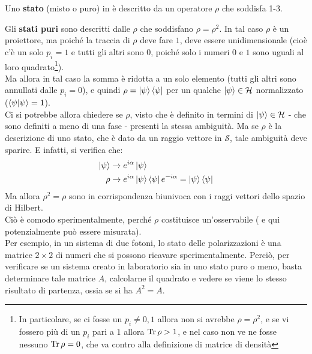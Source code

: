 \documentclass[../../FisicaTeorica.tex]{subfiles}
\begin{document}
\begin{dfn}
Uno \textbf{stato} (misto o puro) in \MQ è descritto da un operatore $\rho$ che soddisfa 1-3.
\end{dfn}
Gli \textbf{stati puri} sono descritti dalle $\rho$ che soddisfano $\rho =\rho^2$. In tal caso $\rho$  è un proiettore, ma poiché la traccia di $\rho$ deve fare $1$, deve essere unidimensionale (cioè c'è un solo $p_i=1$ e tutti gli altri sono $0$, poiché solo i numeri $0$ e $1$ sono uguali al loro quadrato\footnote{In particolare, se ci fosse un $p_i \neq 0,1$ allora non si avrebbe $\rho = \rho^2$, e se vi fossero più di un $p_i$ pari a $1$ allora $\operatorname{Tr}\rho > 1$, e nel caso non ve ne fosse nessuno $\operatorname{Tr}\rho = 0$, che va contro alla definizione di matrice di densità}).\\
Ma allora in tal caso la somma è ridotta a un solo elemento (tutti gli altri sono annullati dalle $p_i = 0$), e quindi $\rho =\ket{\psi}\bra{\psi}$ per un qualche $\ket{\psi}\in \mathcal{H}$ normalizzato  ($\braket{\psi|\psi}=1$).\\
Ci si potrebbe allora chiedere se $\rho$, visto che è definito in termini di $\ket{\psi}\in \mathcal{H}$ - che sono definiti a meno di una fase - presenti la stessa ambiguità. Ma se $\rho$ è la descrizione di uno stato, che è dato da un raggio vettore in $\mathcal{S}$, tale ambiguità deve sparire. E infatti, si verifica che:
\begin{align*}
    \ket{\psi}&\rightarrow e^{i\alpha}\ket{\psi}\\
\rho &\rightarrow e^{i\alpha}\ket{\psi}\bra{\psi}e^{-i\alpha}=\ket{\psi}\bra{\psi}
\end{align*}
Ma allora $\rho^2=\rho$ sono in corrispondenza biunivoca con i raggi vettori dello spazio di Hilbert.\\
Ciò è comodo sperimentalmente, perché $\rho$ costituisce un'osservabile ( e qui potenzialmente può essere misurata).\\
Per esempio, in un sistema di due fotoni, lo stato delle polarizzazioni è una matrice $2\times 2$ di numeri che si possono ricavare sperimentalmente. Perciò, per verificare se un sistema creato in laboratorio sia in uno stato puro o meno, basta determinare tale matrice $A$, calcolarne il quadrato e vedere se viene lo stesso risultato di partenza, ossia se si ha $A^2 = A$.\\
\end{document}
